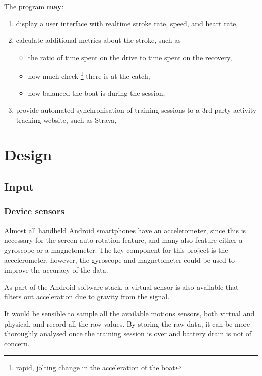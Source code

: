 \documentclass[11pt,twoside,a4paper]{report}
\begin{document}
The program \textbf{may}:
\begin{enumerate}
  \item display a user interface with realtime stroke rate, speed, and heart rate,
  \item calculate additional metrics about the stroke, such as
    \begin{itemize}
      \item the ratio of time spent on the drive to time spent on the recovery,
      \item how much check \footnote{rapid, jolting change in the acceleration of the boat} there is at the catch,
      \item how balanced the boat is during the session,
    \end{itemize}
  \item provide automated synchronisation of training sessions to a 3rd-party activity tracking website, such as Strava, 
\end{enumerate}

\chapter{Design}

\section{Input}

\subsection{Device sensors}

Almost all handheld Android smartphones have an accelerometer, since this is necessary for the screen auto-rotation feature, and many also feature either a gyroscope or a magnetometer. \cite{android_motion_sensors} 
The key component for this project is the accelerometer, however, the gyroscope and magnetometer could be used to improve the accuracy of the data.

As part of the Android software stack, a virtual sensor is also available that filters out acceleration due to gravity from the signal. \cite{android_linear_accel} 

It would be sensible to sample all the available motions sensors, both virtual and physical, and record all the raw values. 
By storing the raw data, it can be more thoroughly analysed once the training session is over and battery drain is not of concern.
\end{document}

